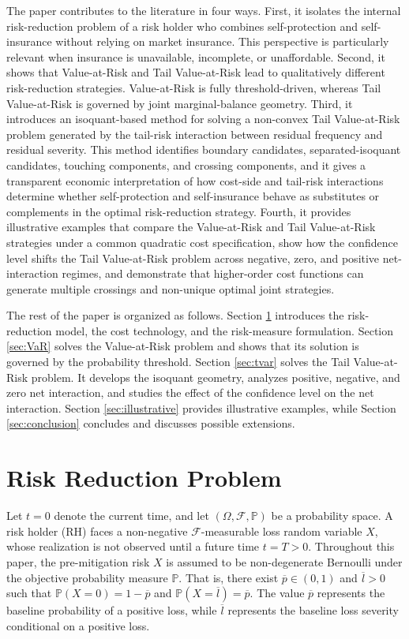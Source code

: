 \documentclass[a4paper,12pt]{article}
\begin{document}
The paper contributes to the literature in four ways. First, it isolates the internal risk-reduction problem of a risk holder who combines self-protection and self-insurance without relying on market insurance. This perspective is particularly relevant when insurance is unavailable, incomplete, or unaffordable. Second, it shows that Value-at-Risk and Tail Value-at-Risk lead to qualitatively different risk-reduction strategies. Value-at-Risk is fully threshold-driven, whereas Tail Value-at-Risk is governed by joint marginal-balance geometry. Third, it introduces an isoquant-based method for solving a non-convex Tail Value-at-Risk problem generated by the tail-risk interaction between residual frequency and residual severity. This method identifies boundary candidates, separated-isoquant candidates, touching components, and crossing components, and it gives a transparent economic interpretation of how cost-side and tail-risk interactions determine whether self-protection and self-insurance behave as substitutes or complements in the optimal risk-reduction strategy. Fourth, it provides illustrative examples that compare the Value-at-Risk and Tail Value-at-Risk strategies under a common quadratic cost specification, show how the confidence level shifts the Tail Value-at-Risk problem across negative, zero, and positive net-interaction regimes, and demonstrate that higher-order cost functions can generate multiple crossings and non-unique optimal joint strategies.

The rest of the paper is organized as follows. Section \ref{sec:problem} introduces the risk-reduction model, the cost technology, and the risk-measure formulation. Section \ref{sec:VaR} solves the Value-at-Risk problem and shows that its solution is governed by the probability threshold. Section \ref{sec:tvar} solves the Tail Value-at-Risk problem. It develops the isoquant geometry, analyzes positive, negative, and zero net interaction, and studies the effect of the confidence level on the net interaction. Section \ref{sec:illustrative} provides illustrative examples, while Section \ref{sec:conclusion} concludes and discusses possible extensions.

\section{Risk Reduction Problem}\label{sec:problem}
Let $t=0$ denote the current time, and let $\left(\Omega,\mathcal{F},\mathbb{P}\right)$ be a probability space. A risk holder (RH) faces a non-negative $\mathcal{F}$-measurable loss random variable $X$, whose realization is not observed until a future time $t=T>0$. Throughout this paper, the pre-mitigation risk $X$ is assumed to be non-degenerate Bernoulli under the objective probability measure $\mathbb{P}$. That is, there exist $\overline{p}\in\left(0,1\right)$ and $\overline{l}>0$ such that $\mathbb{P}\left(X=0\right)=1-\overline{p}$ and $\mathbb{P}\left(X=\overline{l}\right)=\overline{p}$. The value $\overline{p}$ represents the baseline probability of a positive loss, while $\overline{l}$ represents the baseline loss severity conditional on a positive loss.
\end{document}
